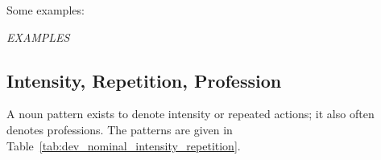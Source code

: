 \documentclass[grammar]{subfiles}
\begin{document}
  Some examples:

  \begin{exe}
    \ex \emph{EXAMPLES}
  \end{exe}

  \subsection{Intensity, Repetition, Profession}
  \label{ssec:dev_nouns_intensity_repetition_profession}

  A noun pattern exists to denote intensity or repeated actions; it also often denotes professions. 
  The patterns are given in Table~\ref{tab:dev_nominal_intensity_repetition}.

  \begin{table}[htpb]\small\capstart
    \caption{Nouns of intensity and/or repetition\label{tab:dev_nominal_intensity_repetition}}
  \end{table}
\end{document}
